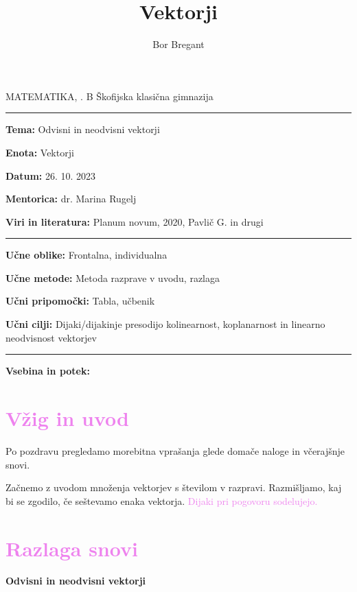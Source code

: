 \documentclass{article}
\title{Vektorji}
\author{Bor Bregant}
\date{\vspace{-5ex}}
\begin{document}
\noindent MATEMATIKA, . B \hfill Škofijska klasična gimnazija
\hrule
\vspace{1ex}
\noindent \textbf{Tema:} Odvisni in neodvisni vektorji
\vspace{1ex}

\noindent \textbf{Enota:} Vektorji
\vspace{1ex}

\noindent \textbf{Datum:} 26. 10. 2023
\vspace{1ex}

\noindent \textbf{Mentorica:} dr. Marina Rugelj
\vspace{1ex}

\noindent \textbf{Viri in literatura:} Planum novum, 2020, Pavlič G. in drugi
\vspace{1ex}
\hrule
\vspace{2ex}
\noindent \textbf{Učne oblike:} Frontalna, individualna
\vspace{1ex}

\noindent \textbf{Učne metode:} Metoda razprave v uvodu, razlaga
\vspace{1ex}

\noindent \textbf{Učni pripomočki:} Tabla, učbenik
\vspace{1ex}

\noindent \textbf{Učni cilji:} Dijaki/dijakinje presodijo kolinearnost, koplanarnost in linearno neodvisnost vektorjev 
\vspace{4ex}
\hrule
\vspace{5ex}
\noindent \textbf{Vsebina in potek:} 

\vspace{5ex}

\section*{\textcolor{violet}{Vžig in uvod}}

Po pozdravu pregledamo morebitna vprašanja glede domače naloge in včerajšnje snovi.

Začnemo z uvodom množenja vektorjev s številom v razpravi. Razmišljamo, kaj bi se zgodilo, če seštevamo enaka vektorja. \textcolor{violet}{Dijaki pri pogovoru sodelujejo.}


\section*{\textcolor{violet}{Razlaga snovi}}

\textbf{Odvisni in neodvisni vektorji}
\end{document}
